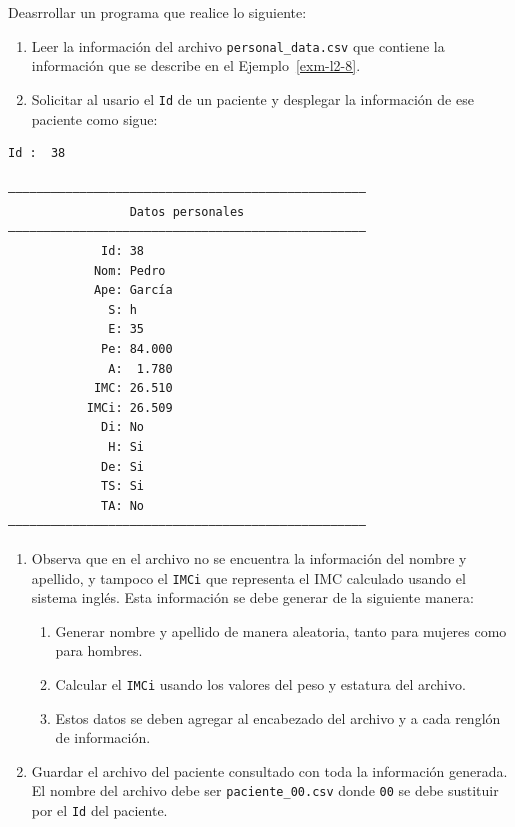 \documentclass[
  spanish,
  letterpaper,
]{scrbook}
\providecommand{\tightlist}{%
  \setlength{\itemsep}{0pt}\setlength{\parskip}{0pt}}
\theoremstyle{definition}
\theoremstyle{remark}
\newcounter{quartocalloutexmno}
\newcommand{\quartocalloutexm}[1]{\refstepcounter{quartocalloutexmno}\label{#1}}
\begin{document}
\begin{tcolorbox}[enhanced jigsaw, colframe=quarto-callout-tip-color-frame, opacityback=0, toprule=.15mm, colback=white, coltitle=black, leftrule=.75mm, arc=.35mm, breakable, left=2mm, bottomtitle=1mm, rightrule=.15mm, bottomrule=.15mm, colbacktitle=quarto-callout-tip-color!10!white, toptitle=1mm, titlerule=0mm, opacitybacktitle=0.6, title={Tip \ref*{exm-l1-ej1}: Índice de masa corporal.}]

\quartocalloutexm{exm-l1-ej1} 

Deasrrollar un programa que realice lo siguiente:

\begin{enumerate}
\def\labelenumi{\arabic{enumi}.}
\tightlist
\item
  Leer la información del archivo \texttt{personal\_data.csv} que
  contiene la información que se describe en el Ejemplo~\ref{exm-l2-8}.
\item
  Solicitar al usario el \texttt{Id} de un paciente y desplegar la
  información de ese paciente como sigue:
\end{enumerate}

\begin{verbatim}
Id :  38

――――――――――――――――――――――――――――――――――――――――――――――――――
                 Datos personales                 
――――――――――――――――――――――――――――――――――――――――――――――――――
             Id: 38
            Nom: Pedro
            Ape: García
              S: h
              E: 35
             Pe: 84.000
              A:  1.780
            IMC: 26.510
           IMCi: 26.509
             Di: No
              H: Si
             De: Si
             TS: Si
             TA: No
――――――――――――――――――――――――――――――――――――――――――――――――――
\end{verbatim}

\begin{enumerate}
\def\labelenumi{\arabic{enumi}.}
\setcounter{enumi}{2}
\tightlist
\item
  Observa que en el archivo no se encuentra la información del nombre y
  apellido, y tampoco el \texttt{IMCi} que representa el IMC calculado
  usando el sistema inglés. Esta información se debe generar de la
  siguiente manera:

  \begin{enumerate}
  \def\labelenumii{\arabic{enumii}.}
  \tightlist
  \item
    Generar nombre y apellido de manera aleatoria, tanto para mujeres
    como para hombres.
  \item
    Calcular el \texttt{IMCi} usando los valores del peso y estatura del
    archivo.
  \item
    Estos datos se deben agregar al encabezado del archivo y a cada
    renglón de información.
  \end{enumerate}
\item
  Guardar el archivo del paciente consultado con toda la información
  generada. El nombre del archivo debe ser \texttt{paciente\_00.csv}
  donde \texttt{00} se debe sustituir por el \texttt{Id} del paciente.
\end{enumerate}

\end{tcolorbox}
\end{document}
